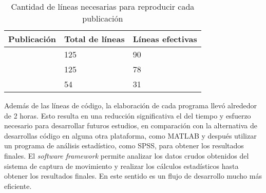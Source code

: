 \begin{table}
    \centering
    \caption{Cantidad de líneas necesarias para reproducir cada publicación}
    \label{tab:eval_lineas}
    \begin{tabular}{lll}
        \toprule
        Publicación & Total de líneas & Líneas efectivas \\
        \midrule
        \cite{mazza} & 125 & 90 \\
        \cite{menz} & 125 & 78 \\
        \cite{mizoguchi} & 54 & 31 \\
        \bottomrule
    \end{tabular}
\end{table}

Además de las líneas de código, la elaboración de cada programa llevó alrededor de 2 horas. Esto resulta en una reducción significativa el del tiempo y esfuerzo necesario para desarrollar futuros estudios, en comparación con la alternativa de desarrollas código en alguna otra plataforma, como MATLAB y después utilizar un programa de análisis estadístico, como SPSS, para obtener los resultados finales. El \emph{software framework} permite analizar los datos crudos obtenidos del sistema de captura de movimiento y realizar los cálculos estadísticos hasta obtener los resultados finales. En este sentido es un flujo de desarrollo mucho más eficiente.  






